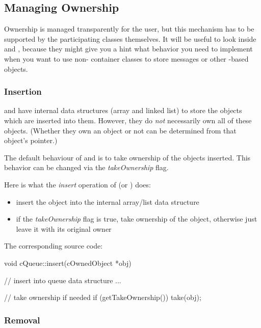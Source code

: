 \subsection{Managing Ownership}

Ownership is managed transparently for the user, but this mechanism
has to be supported by the participating classes themselves.
It will be useful to look inside  and ,
because they might give you a hint what behavior you need
to implement when you want to use non-{\opp} container classes
to store messages or other -based objects.


\subsubsection{Insertion}

 and  have internal data structures
(array and linked list) to store the objects which are inserted
into them. However, they do \textit{not} necessarily own all of these
objects.  (Whether they own an object or not can be determined
from that object's  pointer.)

The default behaviour of  and  is
to take ownership of the objects inserted.
This behavior can be changed via the \textit{takeOwnership} flag.

Here is what the \textit{insert} operation of  (or ) does:
\begin{itemize}
    \item{insert the object into the internal array/list data structure}

    \item{if the \textit{takeOwnership} flag is true, take ownership
    of the object, otherwise just leave it with its original owner}
\end{itemize}

The corresponding source code:

\begin{cpp}
void cQueue::insert(cOwnedObject *obj)
{
    // insert into queue data structure
    ...

    // take ownership if needed
    if (getTakeOwnership())
        take(obj);

}
\end{cpp}


\subsubsection{Removal}

